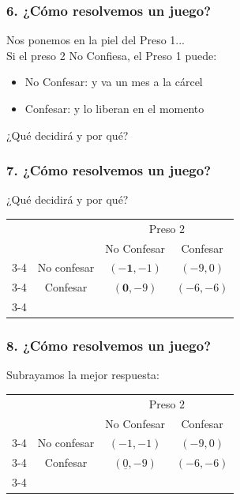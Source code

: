 \documentclass[14pt]{beamer}
\begin{document}
\begin{frame}
\frametitle{6. ¿Cómo resolvemos un juego?}
Nos ponemos en la piel del Preso 1... \\ \vspace{2mm}
Si el preso 2 No Confiesa, el Preso 1 puede: \vspace{2mm}
\begin{itemize}
    \item  No Confesar: y va un mes a la cárcel \\ \vspace{2mm}
    \item Confesar: y lo liberan en el momento
    \\ \vspace{2mm}
\end{itemize}
¿Qué decidirá y por qué?
\end{frame}

\begin{frame}
\frametitle{7. ¿Cómo resolvemos un juego?}
¿Qué decidirá y por qué?
\begin{table}
     \begin{tabular}{cc|c|c|}
      & \multicolumn{1}{c}{} & \multicolumn{2}{c}{Preso $2$}\\
      & \multicolumn{1}{c}{} & \multicolumn{1}{c}{No Confesar}  & \multicolumn{1}{c}{Confesar} \\\cline{3-4}
      \multirow{}{Preso $1$}  & No confesar & $(\boldsymbol{-1},-1)$ & $(-9,0)$ \\\cline{3-4}
      & Confesar & $(\boldsymbol{0},-9)$ & $(-6,-6)$ \\\cline{3-4}
    \end{tabular}
  \end{table}
\end{frame}

\begin{frame}
\frametitle{8. ¿Cómo resolvemos un juego?}
Subrayamos la mejor respuesta:
\begin{table}
     \begin{tabular}{cc|c|c|}
      & \multicolumn{1}{c}{} & \multicolumn{2}{c}{Preso $2$}\\
      & \multicolumn{1}{c}{} & \multicolumn{1}{c}{No Confesar}  & \multicolumn{1}{c}{Confesar} \\\cline{3-4}
      \multirow{}{Preso $1$}  & No confesar & $(-1,-1)$ & $(-9,0)$ \\\cline{3-4}
      & Confesar & $(\underline{0},-9)$ & $(-6,-6)$ \\\cline{3-4}
    \end{tabular}
  \end{table}
\end{frame}
\end{document}
